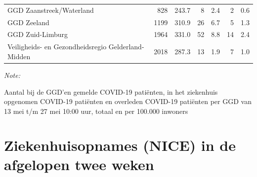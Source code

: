 \documentclass[
  english,
  man,floatsintext]{apa6}
\begin{document}
\begin{table}
\begin{threeparttable}
\begin{tabular}{lrrrrrr}
GGD Zaanstreek/Waterland & 828 & 243.7 & 8 & 2.4 & 2 & 0.6\\
GGD Zeeland & 1199 & 310.9 & 26 & 6.7 & 5 & 1.3\\
GGD Zuid-Limburg & 1964 & 331.0 & 52 & 8.8 & 14 & 2.4\\
Veiligheids- en Gezondheidsregio Gelderland-Midden & 2018 & 287.3 & 13 & 1.9 & 7 & 1.0\\
\bottomrule
\end{tabular}
\begin{tablenotes}
\item \textit{Note: } 
\item Aantal bij de GGD’en gemelde COVID-19 patiënten, in het ziekenhuis opgenomen COVID-19 patiënten en overleden COVID-19 patiënten per GGD van 13 mei t/m 27 mei 10:00 uur, totaal en per 100.000 inwoners
\end{tablenotes}
\end{threeparttable}
\endgroup{}
\end{table}

\newpage

\hypertarget{ziekenhuisopnames-nice-in-de-afgelopen-twee-weken}{%
\section{Ziekenhuisopnames (NICE) in de afgelopen twee weken}\label{ziekenhuisopnames-nice-in-de-afgelopen-twee-weken}}
\end{document}
